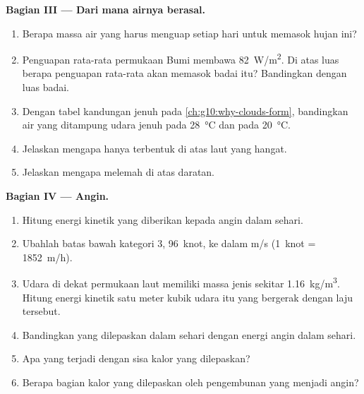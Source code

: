 \begin{problem}
\medskip
\noindent\textbf{Bagian III --- Dari mana airnya berasal.}
\begin{enumerate}[resume]
  \item Berapa massa air yang harus menguap setiap hari untuk memasok hujan
        ini?
  \item Penguapan rata-rata permukaan Bumi membawa \qty{82}{W/m^2}. Di atas
        luas berapa penguapan rata-rata akan memasok  badai itu?
        Bandingkan dengan luas badai.
  \item Dengan tabel kandungan jenuh pada \cref{ch:g10:why-clouds-form},
        bandingkan air yang ditampung udara jenuh pada
        \qty{28}{\degreeCelsius} dan pada \qty{20}{\degreeCelsius}.
  \item Jelaskan mengapa  hanya terbentuk di atas laut yang
        hangat.
  \item Jelaskan mengapa  melemah di atas daratan.
\end{enumerate}

\medskip
\noindent\textbf{Bagian IV --- Angin.}
\begin{enumerate}[resume]
  \item Hitung energi kinetik yang diberikan kepada angin dalam sehari.
  \item Ubahlah batas bawah kategori 3, \num{96}~knot, ke dalam
        \unit{m/s} (\num{1}~knot = \qty{1852}{m/h}).
  \item Udara di dekat permukaan laut memiliki massa jenis sekitar
        \qty{1.16}{kg/m^3}. Hitung energi kinetik satu meter kubik udara
        itu yang bergerak dengan laju tersebut.
  \item Bandingkan  yang dilepaskan dalam sehari dengan energi
        angin dalam sehari.
  \item Apa yang terjadi dengan sisa kalor yang dilepaskan?
  \item Berapa bagian kalor yang dilepaskan oleh pengembunan yang menjadi
        angin?
\end{enumerate}
\end{problem}
